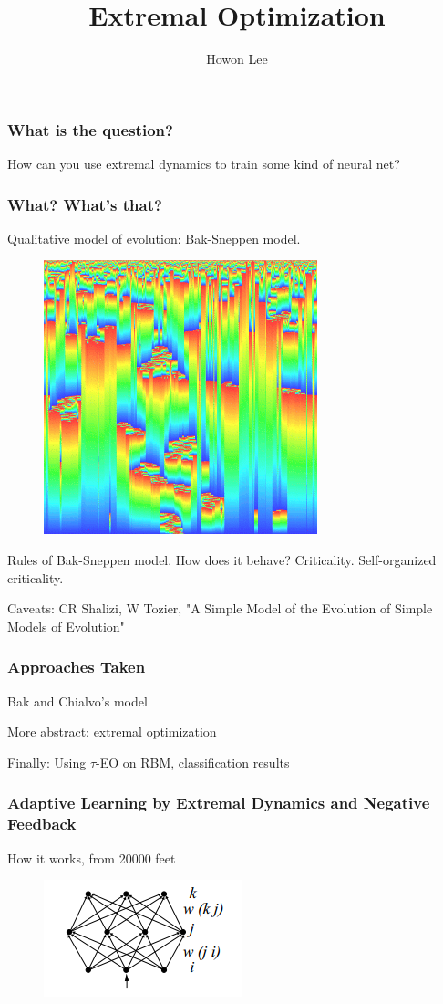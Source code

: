 \documentclass{beamer}
\begin{document}
\title{Extremal Optimization}
\author{Howon Lee}
\maketitle

\begin{frame}
  \frametitle{What is the question?}
  How can you use extremal dynamics to train some kind of neural net?
\end{frame}

\begin{frame}
  \frametitle{What? What's that?}
  Qualitative model of evolution: Bak-Sneppen model.
  \begin{figure}
    \includegraphics{bak_sneppen}
  \end{figure}

  Rules of Bak-Sneppen model. How does it behave? Criticality. Self-organized criticality.

  Caveats: CR Shalizi, W Tozier, "A Simple Model of the Evolution of Simple Models of Evolution"
\end{frame}

\begin{frame}
  \frametitle{Approaches Taken}
  Bak and Chialvo's model

  More abstract: extremal optimization

  Finally: Using $\tau$-EO on RBM, classification results
\end{frame}

\begin{frame}
  \frametitle{Adaptive Learning by Extremal Dynamics and Negative Feedback}
  How it works, from 20000 feet
  \begin{figure}
    \includegraphics{bak_chialvo_net_topology}
  \end{figure}
\end{frame}
\end{document}
